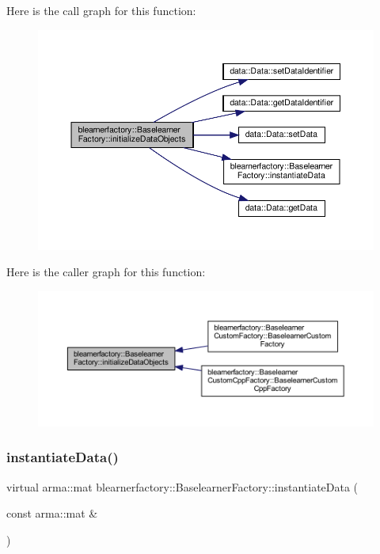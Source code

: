 Here is the call graph for this function\+:\nopagebreak
\begin{figure}[H]
\begin{center}
\leavevmode
\includegraphics[width=350pt]{classblearnerfactory_1_1_baselearner_factory_a147d4ef123ec382fe402d562a91df4d2_cgraph}
\end{center}
\end{figure}
Here is the caller graph for this function\+:\nopagebreak
\begin{figure}[H]
\begin{center}
\leavevmode
\includegraphics[width=350pt]{classblearnerfactory_1_1_baselearner_factory_a147d4ef123ec382fe402d562a91df4d2_icgraph}
\end{center}
\end{figure}
\mbox{\label{classblearnerfactory_1_1_baselearner_factory_ac4a38c4815fb33b8d4785745117c5e57}} 
\subsubsection{\texorpdfstring{instantiate\+Data()}{instantiateData()}}
{\footnotesize\ttfamily virtual arma\+::mat blearnerfactory\+::\+Baselearner\+Factory\+::instantiate\+Data (\begin{DoxyParamCaption}\item[{const arma\+::mat \&}]{ }\end{DoxyParamCaption})\hspace{0.3cm}{\ttfamily [pure virtual]}}



